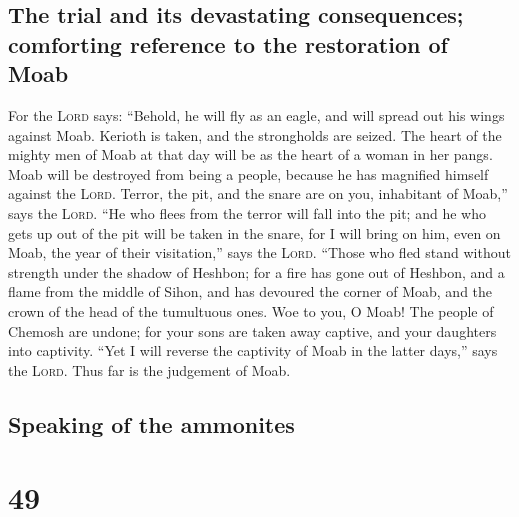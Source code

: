 \hypertarget{the-trial-and-its-devastating-consequences-comforting-reference-to-the-restoration-of-moab}{%
\subsection{The trial and its devastating consequences; comforting
reference to the restoration of
Moab}\label{the-trial-and-its-devastating-consequences-comforting-reference-to-the-restoration-of-moab}}

 For the \textsc{Lord} says: ``Behold, he will fly as an
eagle, and will spread out his wings against Moab. 
Kerioth is taken, and the strongholds are seized. The heart of the
mighty men of Moab at that day will be as the heart of a woman in her
pangs.  Moab will be destroyed from being a people,
because he has magnified himself against the \textsc{Lord}.
 Terror, the pit, and the snare are on you, inhabitant of
Moab,'' says the \textsc{Lord}.  ``He who flees from the
terror will fall into the pit; and he who gets up out of the pit will be
taken in the snare, for I will bring on him, even on Moab, the year of
their visitation,'' says the \textsc{Lord}.  ``Those who
fled stand without strength under the shadow of Heshbon; for a fire has
gone out of Heshbon, and a flame from the middle of Sihon, and has
devoured the corner of Moab, and the crown of the head of the tumultuous
ones.  Woe to you, O Moab! The people of Chemosh are
undone; for your sons are taken away captive, and your daughters into
captivity.  ``Yet I will reverse the captivity of Moab in
the latter days,'' says the \textsc{Lord}. Thus far is the judgement of
Moab.

\hypertarget{speaking-of-the-ammonites}{%
\subsection{Speaking of the ammonites}\label{speaking-of-the-ammonites}}

\hypertarget{section-48}{%
\section{49}\label{section-48}}

